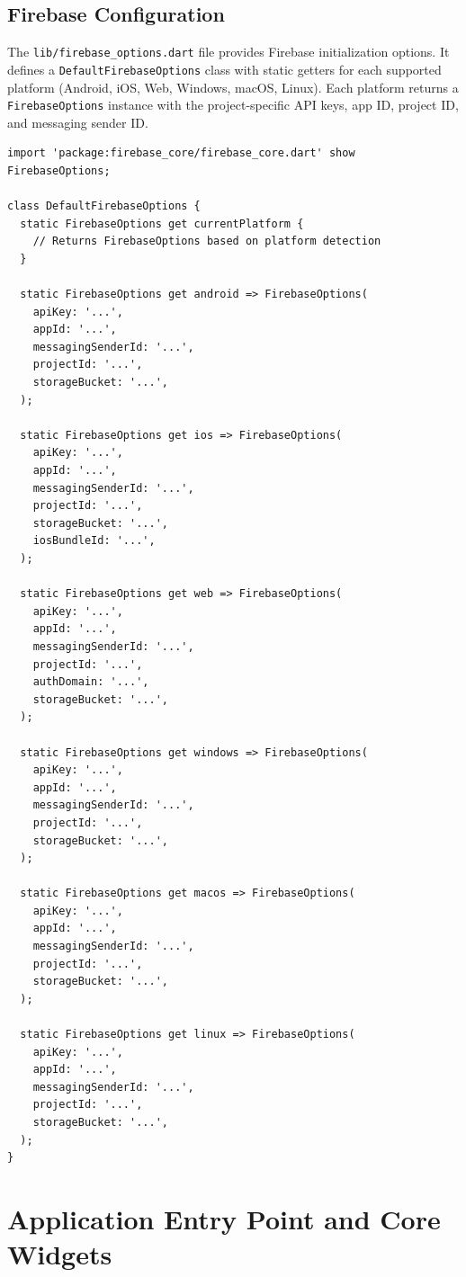 \documentclass[12pt,a4paper,oneside]{report}
\newcommand{\code}[1]{\texttt{#1}}
\begin{document}
\section{Firebase Configuration}

The \texttt{lib/firebase\_options.dart} file provides Firebase initialization options. It defines a \code{DefaultFirebaseOptions} class with static getters for each supported platform (Android, iOS, Web, Windows, macOS, Linux). Each platform returns a \code{FirebaseOptions} instance with the project-specific API keys, app ID, project ID, and messaging sender ID.

\begin{lstlisting}[style=dartstyle]
import 'package:firebase_core/firebase_core.dart' show FirebaseOptions;

class DefaultFirebaseOptions {
  static FirebaseOptions get currentPlatform {
    // Returns FirebaseOptions based on platform detection
  }

  static FirebaseOptions get android => FirebaseOptions(
    apiKey: '...',
    appId: '...',
    messagingSenderId: '...',
    projectId: '...',
    storageBucket: '...',
  );

  static FirebaseOptions get ios => FirebaseOptions(
    apiKey: '...',
    appId: '...',
    messagingSenderId: '...',
    projectId: '...',
    storageBucket: '...',
    iosBundleId: '...',
  );

  static FirebaseOptions get web => FirebaseOptions(
    apiKey: '...',
    appId: '...',
    messagingSenderId: '...',
    projectId: '...',
    authDomain: '...',
    storageBucket: '...',
  );

  static FirebaseOptions get windows => FirebaseOptions(
    apiKey: '...',
    appId: '...',
    messagingSenderId: '...',
    projectId: '...',
    storageBucket: '...',
  );

  static FirebaseOptions get macos => FirebaseOptions(
    apiKey: '...',
    appId: '...',
    messagingSenderId: '...',
    projectId: '...',
    storageBucket: '...',
  );

  static FirebaseOptions get linux => FirebaseOptions(
    apiKey: '...',
    appId: '...',
    messagingSenderId: '...',
    projectId: '...',
    storageBucket: '...',
  );
}
\end{lstlisting}

\chapter{Application Entry Point and Core Widgets}
\label{ch:entry}
\end{document}
